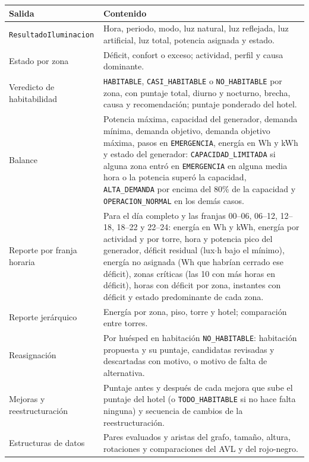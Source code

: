 \documentclass[12pt,a4paper]{article}
\newcommand{\clase}[1]{\texttt{#1}}
\newcommand{\estado}[1]{\texttt{#1}}
\begin{document}
\begin{center}\small
\begin{tabular}{p{}p{}}
\toprule
\textbf{Salida} & \textbf{Contenido}\\
\midrule
\clase{ResultadoIluminacion} & Hora, periodo, modo, luz natural, luz reflejada, luz artificial, luz total, potencia asignada y estado.\\
Estado por zona & Déficit, confort o exceso; actividad, perfil y causa dominante.\\
Veredicto de habitabilidad & \estado{HABITABLE}, \estado{CASI\_HABITABLE} o \estado{NO\_HABITABLE} por zona, con puntaje total, diurno y nocturno, brecha, causa y recomendación; puntaje ponderado del hotel.\\
Balance & Potencia máxima, capacidad del generador, demanda mínima, demanda objetivo, demanda objetivo máxima, pasos en \estado{EMERGENCIA}, energía en Wh y kWh y estado del generador: \estado{CAPACIDAD\_LIMITADA} si alguna zona entró en \estado{EMERGENCIA} en alguna media hora o la potencia superó la capacidad, \estado{ALTA\_DEMANDA} por encima del 80\% de la capacidad y \estado{OPERACION\_NORMAL} en los demás casos.\\
Reporte por franja horaria & Para el día completo y las franjas 00--06, 06--12, 12--18, 18--22 y 22--24: energía en Wh y kWh, energía por actividad y por torre, hora y potencia pico del generador, déficit residual (lux$\cdot$h bajo el mínimo), energía no asignada (Wh que habrían cerrado ese déficit), zonas críticas (las 10 con más horas en déficit), horas con déficit por zona, instantes con déficit y estado predominante de cada zona.\\
Reporte jerárquico & Energía por zona, piso, torre y hotel; comparación entre torres.\\
Reasignación & Por huésped en habitación \estado{NO\_HABITABLE}: habitación propuesta y su puntaje, candidatas revisadas y descartadas con motivo, o motivo de falta de alternativa.\\
Mejoras y reestructuración & Puntaje antes y después de cada mejora que sube el puntaje del hotel (o \estado{TODO\_HABITABLE} si no hace falta ninguna) y secuencia de cambios de la reestructuración.\\
Estructuras de datos & Pares evaluados y aristas del grafo, tamaño, altura, rotaciones y comparaciones del AVL y del rojo-negro.\\
\bottomrule
\end{tabular}
\end{center}
\end{document}
